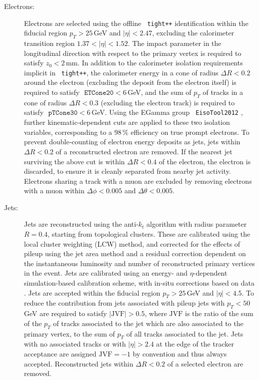 \begin{description}
\item[Electrons:] Electrons are selected using the offline \texttt{ tight++} 
identification within the fiducial region $p_T>25$\,GeV and $|\eta|<2.47$, 
excluding the calorimeter transition region $1.37<|\eta|<1.52$. The impact parameter
in the longitudinal direction with respect to the primary vertex is
required to satisfy $z_0<2$\,mm. In addition 
to the calorimeter isolation requirements implicit in \texttt{ tight++},
the calorimeter energy in a cone of radius $\Delta R<0.2$ around the
electron (excluding the deposit from the electron itself) is required
to satisfy $\texttt{ ETCone20}<6$\,GeV, and the sum of $p_T$ of tracks
in a cone of radius $\Delta R<0.3$ (excluding the electron track) is
required to satisfy $\texttt{ pTCone30}<6$\,GeV. Using the
EGamma group \texttt{ EisoTool2012} \cite{eisotool}, further
kinematic-dependent cuts are applied to these two isolation variables,
corresponding to a 98\,\% efficiency on true prompt electrons. 
To prevent double-counting
of electron energy deposits as jets, jets within $\Delta R<0.2$ of 
a reconstructed electron are removed. If the nearest jet surviving
the above cut is within $\Delta R<0.4$ of the electron, the electron
is discarded, to ensure it is cleanly separated from nearby jet activity. Electrons sharing a track with a muon are excluded by removing electrons with a muon within $\Delta \phi < 0.005$ and $\Delta \theta < 0.005$.

\item[Jets:] Jets are reconstructed using the anti-$k_t$ algorithm 
\cite{antikt1,antikt2,antikt3} with radius parameter $R=0.4$, 
starting from topological clusters. These are calibrated
using the local cluster weighting (LCW) method, and corrected for the
effects of pileup using the jet area method and a residual correction dependent
on the instantaneous luminosity and number of reconstructed primary vertices 
in the event. Jets are calibrated using an energy- and $\eta$-dependent simulation-based calibration scheme, with in-situ corrections 
based on data \cite{jesxi}. Jets are accepted within the fiducial region $p_T>25$\,GeV and $|\eta|<4.5$. To reduce the contribution from jets 
associated with pileup jets with $p_T<50$\,GeV
are required to satisfy $|\textrm{JVF}|>0.5$, where $\textrm{JVF}$ is
the ratio of the sum of the $p_T$ of tracks associated to the jet which
are also associated to the primary vertex, to the sum of $p_T$ of all
tracks associated to the jet. Jets with no associated tracks or with
$|\eta|>2.4$ at the edge of the tracker acceptance  are assigned
$\textrm{JVF}=-1$ by convention and thus always accepted.
Reconstructed jets 
within $\Delta R<0.2$ of a selected electron are removed.


\end{description}
